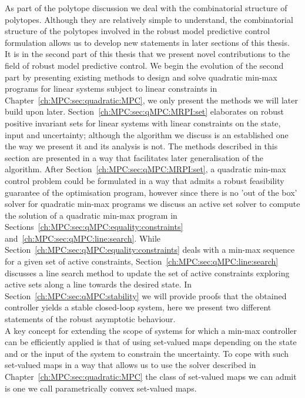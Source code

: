 %
As part of the polytope discussion we deal with the combinatorial structure of polytopes.
%
Although they are relatively simple to understand, the combinatorial structure of the polytopes involved in the robust model predictive control formulation allows us to develop new statements in later sections of this thesis.
%
\\[1em]
%
It is in the second part of this thesis that we present novel contributions to the field of robust model predictive control.
%
We begin the evolution of the second part by presenting existing methods to design and solve quadratic min-max programs for linear systems subject to linear constraints in Chapter~\ref{ch:MPC:sec:quadratic:MPC}, we only present the methods we will later build upon later.
%
Section~\ref{ch:MPC:sec:qMPC:MRPI:set} elaborates on robust positive invariant sets for linear systems with linear constraints on the state, input and uncertainty; although the algorithm we discuss is an established one the way we present it and its analysis is not.
%
The methods described in this section are presented in a way that facilitates later generalisation of the algorithm.
%
After Section~\ref{ch:MPC:sec:qMPC:MRPI:set}, a quadratic min-max control problem could be formulated in a way that admits a robust feasibility guarantee of the optimisation program, however since there is no 'out of the box' solver for quadratic min-max programs we discuss an active set solver to compute the solution of a quadratic min-max program in Sections~\ref{ch:MPC:sec:qMPC:equality:constraints} and~\ref{ch:MPC:sec:qMPC:line:search}.
%
While Section~\ref{ch:MPC:sec:qMPC:equality:constraints} deals with a min-max sequence for a given set of active constraints, Section~\ref{ch:MPC:sec:qMPC:line:search} discusses a line search method to update the set of active constraints exploring active sets along a line towards the desired state.
%
In Section~\ref{ch:MPC:sec:qMPC:stability} we will provide proofs that the obtained controller yields a stable closed-loop system, here we present two different statements of the robust asymptotic behaviour.
%
\\[1em]
%
A key concept for extending the scope of systems for which a min-max controller can be efficiently applied is that of using set-valued maps depending on the state and or the input of the system to constrain the uncertainty.
%
To cope with such set-valued maps in a way that allows us to use the solver described in Chapter~\ref{ch:MPC:sec:quadratic:MPC} the class of set-valued maps we can admit is one we call parametrically convex set-valued maps.
